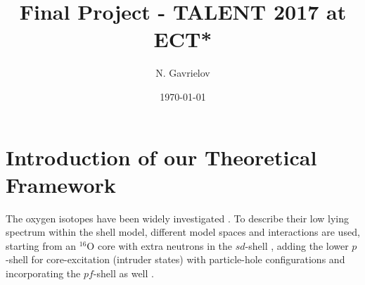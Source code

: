\documentclass[aps,prl,reprint,groupedaddress]{revtex4-1}  %
\begin{document}
\title{Final Project - TALENT 2017 at ECT*}


\author{N. Gavrielov}
\affiliation{}


\date{\today}

\begin{abstract}
\end{abstract}

\pacs{}

\maketitle


\section{Introduction of our Theoretical Framework}
The oxygen isotopes have been widely investigated \citep[for a review see][]{Brown2017}. To describe their low lying spectrum within the shell model, different model spaces and interactions are used, starting from an $^{16}$O core with extra neutrons in the $sd$-shell \cite{Kuo1966,Wildenthal1984,Brown1988,Brown2006}, adding the lower $p$-shell for core-excitation (intruder states) with particle-hole configurations \cite{Lawson1976} and incorporating the $pf$-shell as well \cite{Utsuno1999}.
\end{document}
